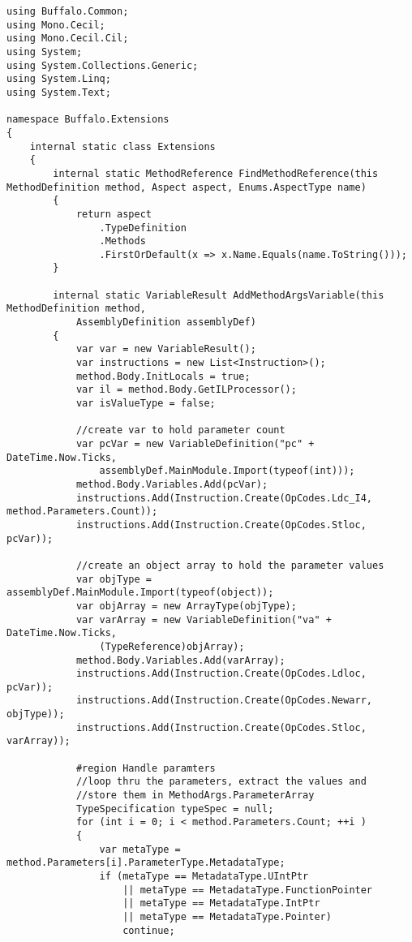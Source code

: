 \begin{lstlisting}[caption={../buffalo/Extensions/Extensions.cs}, label=../buffalo/Extensions/Extensions.cs, frame=tb, basicstyle=\scriptsize]﻿using Buffalo.Common;
using Mono.Cecil;
using Mono.Cecil.Cil;
using System;
using System.Collections.Generic;
using System.Linq;
using System.Text;

namespace Buffalo.Extensions
{
    internal static class Extensions
    {
        internal static MethodReference FindMethodReference(this MethodDefinition method, Aspect aspect, Enums.AspectType name)
        {
            return aspect
                .TypeDefinition
                .Methods
                .FirstOrDefault(x => x.Name.Equals(name.ToString()));
        }

        internal static VariableResult AddMethodArgsVariable(this MethodDefinition method,
            AssemblyDefinition assemblyDef)
        {
            var var = new VariableResult();
            var instructions = new List<Instruction>();
            method.Body.InitLocals = true;
            var il = method.Body.GetILProcessor();
            var isValueType = false;
            
            //create var to hold parameter count
            var pcVar = new VariableDefinition("pc" + DateTime.Now.Ticks,
                assemblyDef.MainModule.Import(typeof(int)));
            method.Body.Variables.Add(pcVar);
            instructions.Add(Instruction.Create(OpCodes.Ldc_I4, method.Parameters.Count));
            instructions.Add(Instruction.Create(OpCodes.Stloc, pcVar));

            //create an object array to hold the parameter values
            var objType = assemblyDef.MainModule.Import(typeof(object));
            var objArray = new ArrayType(objType);
            var varArray = new VariableDefinition("va" + DateTime.Now.Ticks,
                (TypeReference)objArray);
            method.Body.Variables.Add(varArray);
            instructions.Add(Instruction.Create(OpCodes.Ldloc, pcVar));
            instructions.Add(Instruction.Create(OpCodes.Newarr, objType));
            instructions.Add(Instruction.Create(OpCodes.Stloc, varArray));

            #region Handle paramters
            //loop thru the parameters, extract the values and 
            //store them in MethodArgs.ParameterArray
            TypeSpecification typeSpec = null;
            for (int i = 0; i < method.Parameters.Count; ++i )
            {
                var metaType = method.Parameters[i].ParameterType.MetadataType;
                if (metaType == MetadataType.UIntPtr
                    || metaType == MetadataType.FunctionPointer
                    || metaType == MetadataType.IntPtr
                    || metaType == MetadataType.Pointer)
                    continue;


\end{lstlisting}
